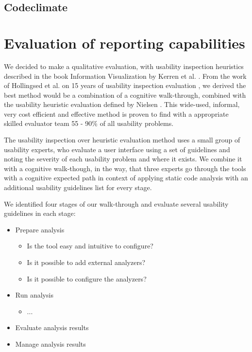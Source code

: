 \documentclass[conference]{IEEEtran}
\begin{document}



\subsection{Codeclimate}
\label{subsec:codeclimate}



\section{Evaluation of reporting capabilities}
\label{sec:evaluation}
We decided to make a qualitative evaluation, with usability inspection heuristics described in the book Information Visualization by Kerren et al. \cite{InformationVisualizationBook}.
From the work of Hollingsed et al. on 15 years of usability inspection evaluation \cite{15yearsUsabilityEvaluation}, we derived the best method would be a combination of a cognitive walk-through, combined with the usability heuristic evaluation defined by Nielsen \cite{Nielsen:UsabilityInspectionMethods}.
This wide-used, informal, very cost efficient and effective method is proven to find with a appropriate skilled evaluator team 55 - 90\% of all usability problems.


The usability inspection over heuristic evaluation method uses a small group of usability experts, who evaluate a
user interface using a set of guidelines and noting the severity of
each usability problem and where it exists. 
We combine it with a cognitive walk-though, in the way, that three experts go through the tools with a cognitive expected path in context of applying static code analysis with an additional usability guidelines list for every stage.


We identified four stages of our walk-through and evaluate several usability guidelines in each stage:

\begin{itemize}
	\item Prepare analysis
	\begin{itemize}
		\item Is the tool easy and intuitive to configure?
		\item Is it possible to add external analyzers?
		\item Is it possible to configure the analyzers?
	\end{itemize}
	\item Run analysis
	\begin{itemize}
		\item ...
	\end{itemize}
	\item Evaluate analysis results
	\item Manage analysis results
\end{itemize}
\end{document}
